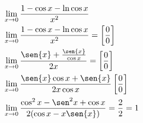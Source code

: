 \begin{ex}
\begin{align}
&\lim_{x\rightarrow 0} \frac{1-\cos{x}-\ln{\cos{x}}}{x^2}\nonumber\\
&\lim_{x\rightarrow 0} \frac{1-\cos{x}-\ln{\cos{x}}}{x^2}=\left[\frac{0}{0}\right]\nonumber\\
&\lim_{x\rightarrow 0} \frac{\sen{x}+\frac{\sen{x}}{\cos{x}}}{2x}=\left[\frac{0}{0}\right]\nonumber\\
&\lim_{x\rightarrow 0} \frac{\sen{x}\cos{x}+\sen{x}}{2x\cos{x}}\left[\frac{0}{0}\right]\nonumber\\
&\lim_{x\rightarrow 0} \frac{\cos^2{x}-\sen^2{x}+\cos{x}}{2(\cos{x}-x\sen{x})}=\frac{2}{2}=1\nonumber
\end{align}
\end{ex}